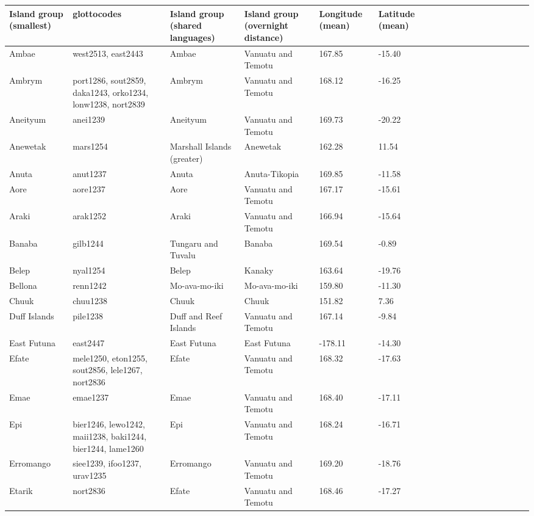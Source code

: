 \documentclass[draft,10pt]{article} %
\begin{document}
\begin{landscape}
\begin{longtable}{| p{2.5cm} |  p{7cm} | p{2.5cm}  | p{2.5cm}  | p{2.5cm}  | p{2.5cm}  | p{2.5cm}  | p{2cm}  | p{1cm} | p{1cm}  | p{1cm} | p{1cm}  | p{1.5cm}  | p{1cm} | p{1cm}  | p{1cm}  |p{1cm}  | p{1cm}    |}
\hline
\textbf{Island group (smallest)}& \textbf{glottocodes}& \textbf{Island group (shared languages)}& \textbf{Island group (overnight distance)}& \textbf{Longitude (mean)}& \textbf{Latitude (mean)} \\ \hline
\endhead
\hline
 Ambae & west2513, east2443 & Ambae & Vanuatu and Temotu & 167.85 & -15.40 \\ \hline
 Ambrym & port1286, sout2859, daka1243, orko1234, lonw1238, nort2839 & Ambrym & Vanuatu and Temotu & 168.12 & -16.25 \\ \hline
 Aneityum & anei1239 & Aneityum & Vanuatu and Temotu & 169.73 & -20.22 \\ \hline
 Anewetak & mars1254 & Marshall Islands (greater) & Anewetak & 162.28 & 11.54 \\ \hline
 Anuta & anut1237 & Anuta & Anuta-Tikopia & 169.85 & -11.58 \\ \hline
 Aore & aore1237 & Aore & Vanuatu and Temotu & 167.17 & -15.61 \\ \hline
 Araki & arak1252 & Araki & Vanuatu and Temotu & 166.94 & -15.64 \\ \hline
 Banaba & gilb1244 & Tungaru and Tuvalu & Banaba & 169.54 & -0.89 \\ \hline
 Belep & nyal1254 & Belep & Kanaky & 163.64 & -19.76 \\ \hline
 Bellona & renn1242 & Mo-ava-mo-iki & Mo-ava-mo-iki & 159.80 & -11.30 \\ \hline
 Chuuk & chuu1238 & Chuuk & Chuuk & 151.82 & 7.36 \\ \hline
 Duff Islands & pile1238 & Duff and Reef Islands & Vanuatu and Temotu & 167.14 & -9.84 \\ \hline
 East Futuna & east2447 & East Futuna & East Futuna & -178.11 & -14.30 \\ \hline
 Efate & mele1250, eton1255, sout2856, lele1267, nort2836 & Efate & Vanuatu and Temotu & 168.32 & -17.63 \\ \hline
 Emae & emae1237 & Emae & Vanuatu and Temotu & 168.40 & -17.11 \\ \hline
 Epi & bier1246, lewo1242, maii1238, baki1244, bier1244, lame1260 & Epi & Vanuatu and Temotu & 168.24 & -16.71 \\ \hline
 Erromango & siee1239, ifoo1237, urav1235 & Erromango & Vanuatu and Temotu & 169.20 & -18.76 \\ \hline
 Etarik & nort2836 & Efate & Vanuatu and Temotu & 168.46 & -17.27 \\ \hline

\end{longtable}
\end{landscape}
\end{document}
